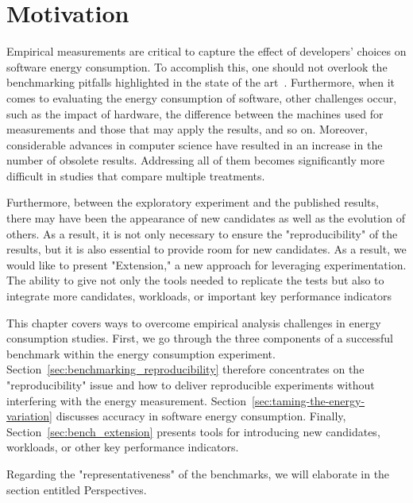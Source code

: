 \section{Motivation}
Empirical measurements are critical to capture the effect of developers' choices on software energy consumption.
To accomplish this, one should not overlook the benchmarking pitfalls highlighted in the state of the art~\cite{van_der_kouwe_benchmarking_2018}.
Furthermore, when it comes to evaluating the energy consumption of software, other challenges occur, such as the impact of hardware, the difference between the machines used for measurements and those that may apply the results, and so on.
Moreover, considerable advances in computer science have resulted in an increase in the number of obsolete results.
Addressing all of them becomes significantly more difficult in studies that compare multiple treatments.

Furthermore, between the exploratory experiment and the published results, there may have been the appearance of new candidates as well as the evolution of others.
As a result, it is not only necessary to ensure the "reproducibility" of the results, but it is also essential to provide room for new candidates.
As a result, we would like to present "Extension," a new approach for leveraging experimentation.
The ability to give not only the tools needed to replicate the tests but also to integrate more candidates, workloads, or important key performance indicators

This chapter covers ways to overcome empirical analysis challenges in energy consumption studies.
First, we go through the three components of a successful benchmark within the energy consumption experiment.
Section~\ref{sec:benchmarking_reproducibility} therefore concentrates on the "reproducibility" issue and how to deliver reproducible experiments without interfering with the energy measurement.
Section~\ref{sec:taming-the-energy-variation}  discusses accuracy in software energy consumption. 
Finally, Section~\ref{sec:bench_extension} presents tools for introducing new candidates, workloads, or other key performance indicators.


Regarding the "representativeness" of the benchmarks, we will elaborate in the section entitled Perspectives.




